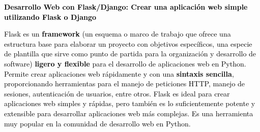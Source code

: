 \documentclass[a4paper]{article}
\begin{document}
\bigskip


\bigskip


\bigskip


\bigskip


\bigskip


\bigskip


\bigskip


\bigskip


\bigskip


\bigskip


\bigskip


\bigskip


\bigskip


\bigskip


\bigskip


\bigskip


\bigskip


\bigskip


\bigskip


\bigskip


\bigskip


\bigskip


\bigskip


\bigskip


\bigskip


\bigskip


\bigskip


\bigskip


\bigskip

{
\textbf{\textcolor{black}{Desarrollo Web con Flask/Django: Crear una aplicación web simple utilizando Flask o Django}}}


\bigskip

{
\textcolor{black}{Flask es un }\textbf{\textcolor{black}{framework}}\textcolor{black}{ (un esquema o marco de trabajo
que ofrece una estructura base para elaborar un proyecto con objetivos específicos, una especie de plantilla que sirve
como punto de partida para la organización y desarrollo de software) }\textbf{\textcolor{black}{ligero y
flexible}}\textcolor{black}{ para el desarrollo de aplicaciones web en Python. Permite crear aplicaciones web
rápidamente y con una }\textbf{\textcolor{black}{sintaxis sencilla}}\textcolor{black}{, proporcionando herramientas
para el manejo de peticiones HTTP, manejo de sesiones, autenticación de usuarios, entre otros. Flask es ideal para
crear aplicaciones web simples y rápidas, pero también es lo suficientemente potente y extensible para desarrollar
aplicaciones web más complejas. Es una herramienta muy popular en la comunidad de desarrollo web en Python.}}
\end{document}
